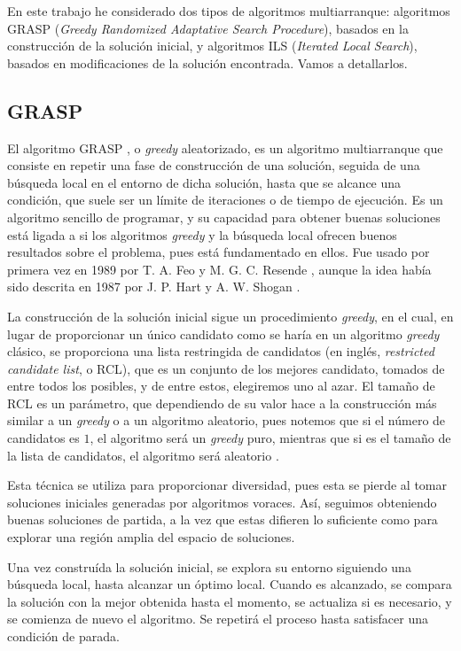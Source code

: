 En este trabajo he considerado dos tipos de algoritmos multiarranque: algoritmos GRASP
(\textit{Greedy Randomized Adaptative Search Procedure}), basados en la construcción
de la solución inicial, y algoritmos ILS (\textit{Iterated Local Search}), basados
en modificaciones de la solución encontrada. Vamos a detallarlos.

\subsection{GRASP}\label{grasp}

El algoritmo GRASP \citep{feo:1995}, o \textit{greedy} aleatorizado, es un algoritmo
multiarranque que consiste en repetir una fase de construcción de una solución,
seguida de una búsqueda local en el entorno de dicha solución, hasta que se alcance
una condición, que suele ser un límite de iteraciones o de tiempo de ejecución.
Es un algoritmo sencillo de programar, y su capacidad para obtener buenas soluciones
está ligada a si los algoritmos \textit{greedy} y la búsqueda local ofrecen buenos
resultados sobre el problema, pues está fundamentado en ellos. Fue usado por primera
vez en 1989 por T. A. Feo y M. G. C. Resende \citep{feo:1989}, aunque la idea había
sido descrita en 1987 por J. P. Hart y A. W. Shogan \citep{hart:1987}.

La construcción de la solución inicial sigue un procedimiento \textit{greedy}, en el cual,
en lugar de proporcionar un único candidato como se haría en un algoritmo \textit{greedy}
clásico, se proporciona una lista restringida de candidatos (en inglés, \textit{restricted candidate list}, o RCL),
que es un conjunto de los mejores candidato, tomados de entre todos los posibles, y de entre estos,
elegiremos uno al azar. El tamaño de RCL es un parámetro, que dependiendo de su valor
hace a la construcción más similar a un \textit{greedy} o a un algoritmo aleatorio,
pues notemos que si el número de candidatos es $1$, el algoritmo será un \textit{greedy}
puro, mientras que si es el tamaño de la lista de candidatos, el algoritmo será aleatorio \citep{herrera:2014}.

Esta técnica se utiliza para proporcionar diversidad, pues esta se pierde al tomar soluciones
iniciales generadas por algoritmos voraces. Así, seguimos obteniendo buenas soluciones de
partida, a la vez que estas difieren lo suficiente como para explorar una región amplia del
espacio de soluciones.

Una vez construída la solución inicial, se explora su entorno siguiendo una búsqueda local,
hasta alcanzar un óptimo local. Cuando es alcanzado, se compara la solución con la mejor obtenida
hasta el momento, se actualiza si es necesario, y se comienza de nuevo el algoritmo.
Se repetirá el proceso hasta satisfacer una condición de parada.

